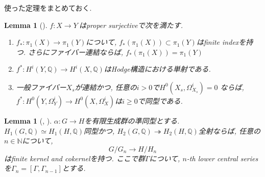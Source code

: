 \documentclass[dvipdfmx,a4paper,11pt]{article} %
\newtheorem{lem}[thm]{Lemma}
\theoremstyle{definition}
\theoremstyle{remark}
\numberwithin{equation}{section}
\newcommand{\N}{\mathbb{N}}
\begin{document}
使った定理をまとめておく. 
\begin{lem}[{\cite[Lemma 1.2]{Voi}}]
\label{lem-Voi-1.2}
 \(  f \colon X \to Y \ \)はproper surjectiveで次を満たす. 
\begin{enumerate}
\item \( f_{*} \colon \pi_1(X) \to \pi_1(Y) \)について, $ f_{*}(\pi_1(X)) \subset \pi_1(Y)$はfinite indexを持つ. さらにファイバー連結ならば,  $f_{*}(\pi_1(X)) =  \pi_1(Y)$
\item  \( f^* \colon H^i(Y,\mathbb{Q}) \to H^i(X,\mathbb{Q}) \)はHodge構造における単射である. 
\item  一般ファイバー\( X_s \)が連結かつ, 任意の\( i>0 \)で\( H^0(X_s,\Omega^i_{X_s}) = 0 \)
ならば, \( f^* \colon H^0(Y,\Omega^i_Y) \to H^0(X,\Omega^i_X) \)は\( i \geq 0 \)で同型である. 
\end{enumerate}
\end{lem}

\begin{lem}[{\cite[Lemma 3.24]{Voi}, \cite[Proposition 6.2]{Wang22}}]
\label{lem-Voi-3.24}
\( \alpha \colon G \to H \)を有限生成群の準同型とする. 
\( H_1(G, \mathbb{Q}) \simeq H_1(H, \mathbb{Q}) \)同型かつ, 
\( H_2(G, \mathbb{Q}) \twoheadrightarrow  H_2(H, \mathbb{Q}) \)全射ならば, 
任意の\( n \in \N \)について,  
\[ G/G_n \to H/H_n \]
はfinite kernel and cokernelを持つ. 
ここで群$\Gamma$について, $n$-th lower central seriesを\( \Gamma_n = [\Gamma, \Gamma_{n-1}] \)とする. 
\end{lem}
\end{document}
